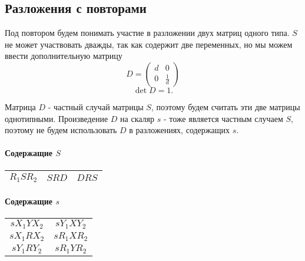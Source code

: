 \subsection{Разложения с повторами}

Под повтором будем понимать участие в разложении двух матриц одного типа.
$S$ не может участвовать дважды, так как содержит две переменных, но мы можем ввести дополнительную матрицу
$$D = \begin{pmatrix}
	d & 0\\
	0 & \frac{1}{d}
\end{pmatrix}$$
$$\det D = 1.$$

Матрица $D$ - частный случай матрицы $S$, поэтому будем считать эти две матрицы однотипными.
Произведение $D$ на скаляр $s$ - тоже является частным случаем $S$, поэтому не будем использовать $D$ в разложениях, содержащих $s$.

\paragraph{Содержащие $S$}

\begin{tabular}{|c|c|c|}
\hline
$R_1SR_2$ & $SRD$ & $DRS$ \\
\hline
\end{tabular}

\paragraph{Содержащие $s$}

\begin{tabular}{|c|c|}
\hline
$sX_1YX_2$ & $sY_1XY_2$ \\
$sX_1RX_2$ & $sR_1XR_2$ \\
$sY_1RY_2$ & $sR_1YR_2$ \\
\hline
\end{tabular}
